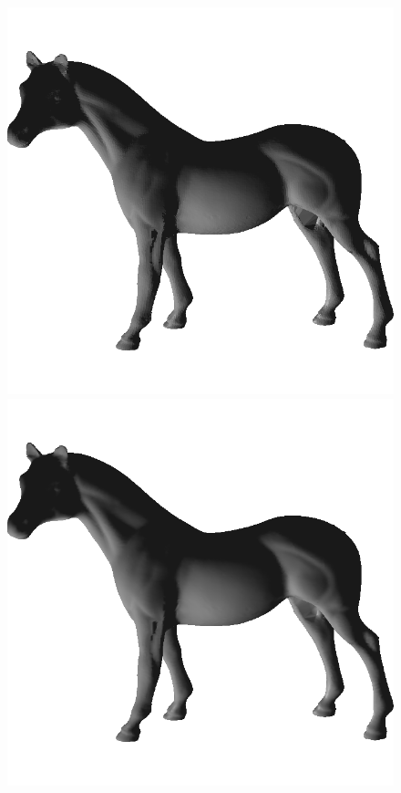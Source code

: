 \begin{figure}[!h]
    \includegraphics[scale=0.39]{images/horse-fs.png}
    \endminipage\hfill
    \centering
    \centering
    \includegraphics[scale=0.39]{images/horse-gs.png}

\end{figure}
